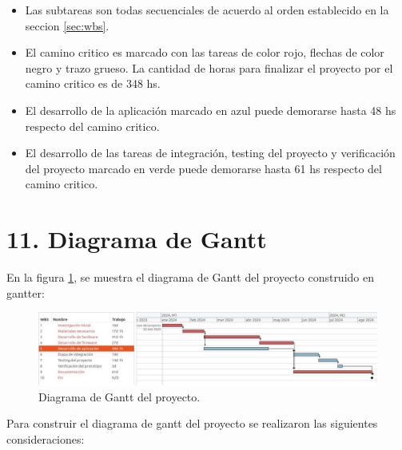 \documentclass[
11pt, %
]{charter}
\begin{document}
\begin{itemize}
	\item Las subtareas son todas secuenciales  de acuerdo al orden establecido en la seccion \ref{sec:wbs}.
	\item El camino critico es marcado con las tareas de color rojo,  flechas de color negro y trazo grueso. La cantidad de horas para finalizar el proyecto por el camino critico es de 348 hs.
	\item El desarrollo de la aplicación marcado en azul puede demorarse hasta 48 hs respecto del camino critico.
	\item El desarrollo de las tareas de integración, testing del proyecto y verificación del proyecto marcado en verde puede demorarse hasta 61 hs respecto del camino critico.
	

\end{itemize}
	


\section{11. Diagrama de Gantt}
\label{sec:gantt}

En la figura \ref{fig:gantt}, se muestra el diagrama de Gantt del proyecto construido en gantter:


\begin{figure}[htpb]
\centering 
\includegraphics[width=1.0\textwidth, height=.43 \textwidth]{./Figuras/ganttProyecto.pdf}
\caption{Diagrama de Gantt del proyecto.}
\label{fig:gantt}
\end{figure}

Para construir el diagrama de gantt del proyecto se realizaron las siguientes consideraciones:
\end{document}
